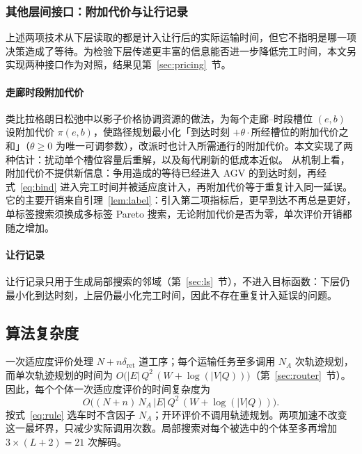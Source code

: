 \documentclass[manuscript,screen,review]{acmart}
\newcommand{\LSRounds}{3}                 %
\newcommand{\LSMaxDecode}{21}             %
\begin{document}
\subsubsection{其他层间接口：附加代价与让行记录}
\label{sec:interface}

上述两项技术从下层读取的都是计入让行后的实际运输时间，但它不指明是哪一项决策造成了等待。为检验下层传递更丰富的信息能否进一步降低完工时间，本文另实现两种接口作为对照，结果见第~\ref{sec:pricing}~节。

\paragraph{走廊时段附加代价}
类比拉格朗日松弛中以影子价格协调资源的做法，为每个走廊--时段槽位 $(e,b)$ 设附加代价 $\pi(e,b)$，使路径规划最小化「到达时刻 $+\theta\cdot$所经槽位的附加代价之和」（$\theta\ge0$ 为唯一可调参数），改派时也计入所需通行的附加代价。本文实现了两种估计：扰动单个槽位容量后重解，以及每代刷新的低成本近似。
从机制上看，附加代价不提供新信息：争用造成的等待已经进入 AGV 的到达时刻，再经式~\eqref{eq:bind} 进入完工时间并被适应度计入，再附加代价等于重复计入同一延误。它的主要开销来自引理~\ref{lem:label}：引入第二项指标后，更早到达不再总是更好，单标签搜索须换成多标签 Pareto 搜索，无论附加代价是否为零，单次评价开销都随之增加。

\paragraph{让行记录}
让行记录只用于生成局部搜索的邻域（第~\ref{sec:ls}~节），不进入目标函数：下层仍最小化到达时刻，上层仍最小化完工时间，因此不存在重复计入延误的问题。

\subsection{算法复杂度}

一次适应度评价处理 $N+n\delta_{\mathrm{ret}}$ 道工序；每个运输任务至多调用 $N_A$ 次轨迹规划，而单次轨迹规划的时间为 $O\bigl(|E|\,Q^{2}\,(W+\log(|V|Q))\bigr)$（第~\ref{sec:router}~节）。因此，每个个体一次适应度评价的时间复杂度为
\begin{equation}
\label{eq:eval_complexity}
O\bigl((N+n)\,N_A\,|E|\,Q^{2}\,(W+\log(|V|Q))\bigr).
\end{equation}
按式~\eqref{eq:rule} 选车时不含因子 $N_A$；开环评价不调用轨迹规划。两项加速不改变这一最坏界，只减少实际调用次数。局部搜索对每个被选中的个体至多再增加 $\LSRounds\times(L+2)=\LSMaxDecode$ 次解码。
\end{document}
